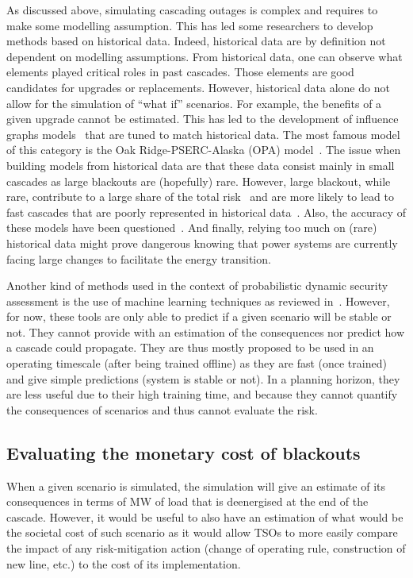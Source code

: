 As discussed above, simulating cascading outages is complex and requires to make some modelling assumption. This has led some researchers to develop methods based on historical data. Indeed, historical data are by definition not dependent on modelling assumptions. From historical data, one can observe what elements played critical roles in past cascades. Those elements are good candidates for upgrades or replacements. However, historical data alone do not allow for the simulation of ``what if'' scenarios. For example, the benefits of a given upgrade cannot be estimated. This has led to the development of influence graphs models~\cite{CascadingInfluenceGraph} that are tuned to match historical data. The most famous model of this category is the Oak Ridge-PSERC-Alaska (OPA) model~\cite{OPA2019}. The issue when building models from historical data are that these data consist mainly in small cascades as large blackouts are (hopefully) rare. However, large blackout, while rare, contribute to a large share of the total risk~\cite{CascadingMethodoAndChallenges} and are more likely to lead to fast cascades that are poorly represented in historical data~\cite{cascadeAcceleration}. Also, the accuracy of these models have been questioned~\cite{TopologicalModelsBad}. And finally, relying too much on (rare) historical data might prove dangerous knowing that power systems are currently facing large changes to facilitate the energy transition.

Another kind of methods used in the context of probabilistic dynamic security assessment is the use of machine learning techniques as reviewed in~\cite{MLEfthymios}. However, for now, these tools are only able to predict if a given scenario will be stable or not. They cannot provide with an estimation of the consequences nor predict how a cascade could propagate. They are thus mostly proposed to be used in an operating timescale (after being trained offline) as they are fast (once trained) and give simple predictions (system is stable or not). In a planning horizon, they are less useful due to their high training time, and because they cannot quantify the consequences of scenarios and thus cannot evaluate the risk.


\subsection{Evaluating the monetary cost of blackouts}
\label{sec:blackout_cost}

When a given scenario is simulated, the simulation will give an estimate of its consequences in terms of MW of load that is deenergised at the end of the cascade. However, it would be useful to also have an estimation of what would be the societal cost of such scenario as it would allow TSOs to more easily compare the impact of any risk-mitigation action (change of operating rule, construction of new line, etc.) to the cost of its implementation.

